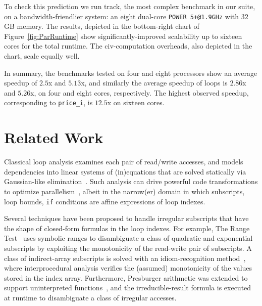 \documentclass{sig-alternate}
\begin{document}
To check this prediction we run {\sc track}, the most complex benchmark in our suite, 
on a bandwidth-friendlier system: an eight dual-core {\tt POWER 5+@1.9GHz} with $32$GB memory. 
The results, depicted in the bottom-right chart of Figure~\ref{fig:ParRuntime} show 
significantly-improved scalability up to sixteen cores for the total runtime. 
The {\sc civ}-computation overheads, also depicted in the chart, scale equally well.  
 
In summary, the benchmarks tested on four and eight processors show
an average speedup of $2.5$x and $5.13$x, and similarly 
the average speedup of loops is $2.86$x and $5.26$x, on four and eight cores, 
respectively.   The highest observed speedup, corresponding to {\tt price\_i}, 
is $12.5$x on sixteen cores.


\section{Related Work}
\label{sec:RelWork}

Classical loop analysis examines each pair of read/write accesses, %
and models dependencies into linear systems of (in)equations that are solved
statically  via Gaussian-like elimination~\cite{BanerjeeIneqTest,FeautrierDataflow}. %
Such analysis  can drive powerful code transformations to optimize 
parallelism~\cite{PolyhedralOpt}, albeit in the narrow(er) domain 
in which subscripts, loop bounds, {\tt if} conditions are affine 
expressions of loop indexes.

Several techniques have been proposed to handle irregular subscripts that have
the shape of closed-form formulas in the loop indexes. For example, 
The Range Test~\cite{Blume94RangeTest} uses symbolic 
ranges to disambiguate a class of quadratic and  
exponential subscripts by exploiting the monotonicity of the read-write pair 
of subscripts.   A class of indirect-array subscripts is solved with 
an idiom-recognition method~\cite{PaduaDemDrInterproc}, where interprocedural 
analysis verifies the (assumed) monotonicity of the values stored in the 
index array.
%
Furthermore, Presburger arithmetic was extended to support
uninterpreted functions~\cite{Pugh98NonlinPresb}, and the irreducible-result
formula is executed at runtime to disambiguate a class of irregular
accesses. 
\end{document}
